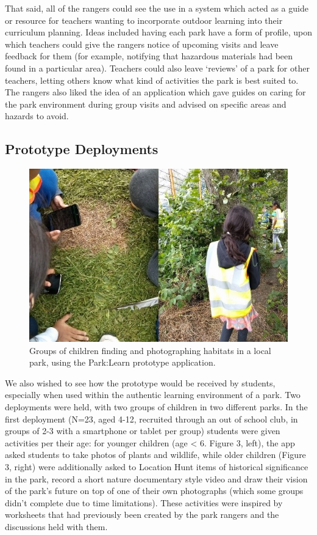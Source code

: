 That said, all of the rangers could see the use in a system which acted as a guide or resource for teachers wanting to incorporate outdoor learning into their curriculum planning. Ideas included having each park have a form of profile, upon which teachers could give the rangers notice of upcoming visits and leave feedback for them (for example, notifying that hazardous materials had been found in a particular area). Teachers could also leave `reviews' of a park for other teachers, letting others know what kind of activities the park is best suited to. The rangers also liked the idea of an application which gave guides on caring for the park environment during group visits and advised on specific areas and hazards to avoid.


\subsection{Prototype Deployments}

\begin{figure}
  \centering
  \includegraphics[width=0.8\columnwidth]{images/chapter04/prototypeDeployment.jpg}
  \caption[Children during the Park:Learn summer school deployment]{Groups of children finding and photographing habitats in a local park, using the Park:Learn prototype application.}
  \label{fig:prototypeDeployment}
\end{figure}

We also wished to see how the prototype would be received by students, especially when used within the authentic learning environment of a park. Two deployments were held, with two groups of children in two different parks. In the first deployment (N=23, aged 4-12, recruited through an out of school club, in groups of 2-3 with a smartphone or tablet per group) students were given activities per their age: for younger children (age < 6. Figure 3, left), the app asked students to take photos of plants and wildlife, while older children (Figure 3, right) were additionally asked to Location Hunt items of historical significance in the park, record a short nature documentary style video and draw their vision of the park’s future on top of one of their own photographs (which some groups didn’t complete due to time limitations). These activities were inspired by worksheets that had previously been created by the park rangers and the discussions held with them. 

